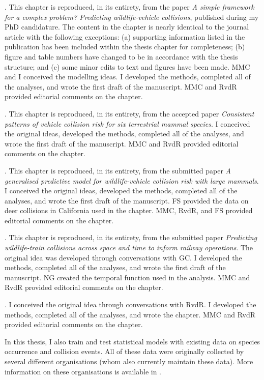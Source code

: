 \documentclass[titlesmallcaps,copyrightpage,examinerscopy]{uomthesis}
\begin{document}
. This chapter is reproduced, in its entirety, from the paper \textit{A simple framework for a complex problem?  Predicting wildlife-vehicle collisions}, published during my PhD candidature. The content in the chapter is nearly identical to the journal article with the following exceptions: (a) supporting information listed in the publication has been included within the thesis chapter for completeness; (b) figure and table numbers have changed to be in accordance with the thesis structure; and (c) some minor edits to text and figures have been made. MMC and I conceived the modelling ideas. I developed the methods, completed all of the analyses, and wrote the first draft of the manuscript. MMC and RvdR provided editorial comments on the chapter.

. This chapter is reproduced, in its entirety, from the accepted paper \textit{Consistent patterns of vehicle collision risk for six terrestrial mammal species}. I conceived the original ideas, developed the methods, completed all of the analyses, and wrote the first draft of the manuscript. MMC and RvdR provided editorial comments on the chapter.

. This chapter is reproduced, in its entirety, from the submitted paper \textit{A generalised predictive model for wildlife-vehicle collision risk with large mammals}. I conceived the original ideas, developed the methods, completed all of the analyses, and wrote the first draft of the manuscript. FS provided the data on deer collisions in California used in the chapter. MMC, RvdR, and FS provided editorial comments on the chapter.

. This chapter is reproduced, in its entirety, from the submitted paper \textit{Predicting wildlife-train collisions across space and time to inform railway operations}. The original idea was developed through conversations with GC. I developed the methods, completed all of the analyses, and wrote the first draft of the manuscript. NG created the temporal function used in the analysis. MMC and RvdR provided editorial comments on the chapter.

. I conceived the original idea through conversations with RvdR. I developed the methods, completed all of the analyses, and wrote the chapter. MMC and RvdR provided editorial comments on the chapter.

In this thesis, I also train and test statistical models with existing data on species occurrence and collision events. All of these data were originally collected by several different organisations (whom also currently maintain these data). More information on these organisations is available in .
\end{document}
